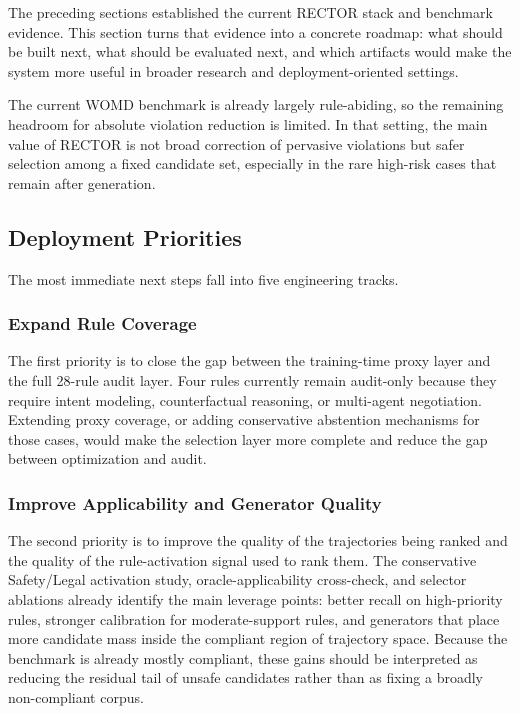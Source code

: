 The preceding sections established the current RECTOR stack and benchmark evidence.  This section turns that evidence into a concrete roadmap: what should be built next, what should be evaluated next, and which artifacts would make the system more useful in broader research and deployment-oriented settings.

The current WOMD benchmark is already largely rule-abiding, so the remaining headroom for absolute violation reduction is limited.  In that setting, the main value of RECTOR is not broad correction of pervasive violations but safer selection among a fixed candidate set, especially in the rare high-risk cases that remain after generation.

\subsection{Deployment Priorities}
\label{subsec:limitations}

The most immediate next steps fall into five engineering tracks.

\subsubsection{Expand Rule Coverage}
The first priority is to close the gap between the training-time proxy layer and the full 28-rule audit layer.  Four rules currently remain audit-only because they require intent modeling, counterfactual reasoning, or multi-agent negotiation.  Extending proxy coverage, or adding conservative abstention mechanisms for those cases, would make the selection layer more complete and reduce the gap between optimization and audit.

\subsubsection{Improve Applicability and Generator Quality}
The second priority is to improve the quality of the trajectories being ranked and the quality of the rule-activation signal used to rank them.  The conservative Safety/Legal activation study, oracle-applicability cross-check, and selector ablations already identify the main leverage points: better recall on high-priority rules, stronger calibration for moderate-support rules, and generators that place more candidate mass inside the compliant region of trajectory space.  Because the benchmark is already mostly compliant, these gains should be interpreted as reducing the residual tail of unsafe candidates rather than as fixing a broadly non-compliant corpus.

